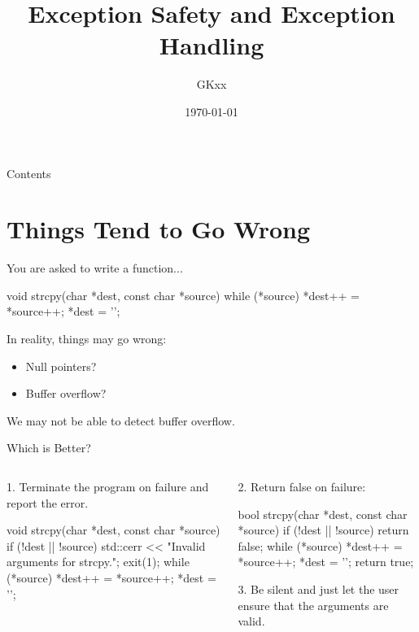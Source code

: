 \documentclass{beamer}
\title{Exception Safety and Exception Handling}
\author{GKxx}
\date{\today}
\begin{document}
\begin{frame}
    \maketitle
\end{frame}

\begin{frame}{Contents}
    \tableofcontents
\end{frame}

\section{Things Tend to Go Wrong}

\begin{frame}[fragile]{}
    You are asked to write a  function...
    \begin{cpp}
void strcpy(char *dest, const char *source) {
  while (*source)
    *dest++ = *source++;
  *dest = '\0';
}
    \end{cpp}
    \pause
    In reality, things may go wrong:
    \begin{itemize}
        \item Null pointers?
        \item Buffer overflow?
    \end{itemize}
    We may not be able to detect buffer overflow.
\end{frame}

\begin{frame}[fragile]{Which is Better?}
    \begin{columns}
        \begin{column}{0.5\textwidth}
            1. Terminate the program on failure and report the error.
            \begin{cpp}
void strcpy(char *dest,
    const char *source) {
  if (!dest || !source) {
    std::cerr << "Invalid arguments for strcpy.\n";
    exit(1);
  }
  while (*source)
    *dest++ = *source++;
  *dest = '\0';
}
            \end{cpp}
        \end{column}
        \begin{column}{0.5\textwidth}
            2. Return false on failure:
            \begin{cpp}
bool strcpy(char *dest,
    const char *source) {
  if (!dest || !source)
    return false;
  while (*source)
    *dest++ = *source++;
  *dest = '\0';
  return true;
}
            \end{cpp}
            3. Be silent and just let the user ensure that the arguments are valid.
        \end{column}
    \end{columns}
\end{frame}
\end{document}
